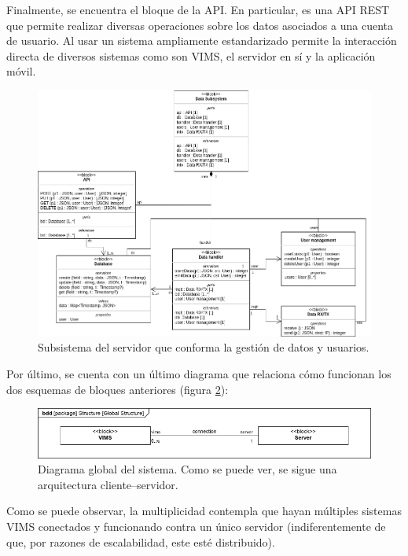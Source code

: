 Finalmente, se encuentra el bloque de la \ac{API}. En particular, es una \ac{API} \ac{REST}
que permite realizar diversas operaciones sobre los datos asociados a una cuenta de
usuario. Al usar un sistema ampliamente estandarizado permite la interacción
directa de diversos sistemas como son \ac{VIMS}, el servidor en sí y la aplicación
móvil.

\begin{figure}[H]
  \centering
  \includegraphics[width=\linewidth]{images/BD-data.png}
  \caption{Subsistema del servidor que conforma la gestión de datos y usuarios.}
  \label{fig:bd-data}
\end{figure}

Por último, se cuenta con un último diagrama que relaciona cómo funcionan los dos
esquemas de bloques anteriores (figura \ref{bd:global}):

\begin{figure}[H]
  \centering
  \includegraphics[width=\linewidth]{images/BlockDiagrams-Global.drawio.png}
  \caption{Diagrama global del sistema. Como se puede ver, se sigue una arquitectura cliente--servidor.}
  \label{bd:global}
\end{figure}

Como se puede observar, la multiplicidad contempla que hayan múltiples sistemas
\ac{VIMS} conectados y funcionando contra un único servidor (indiferentemente de
que, por razones de escalabilidad, este esté distribuido).
